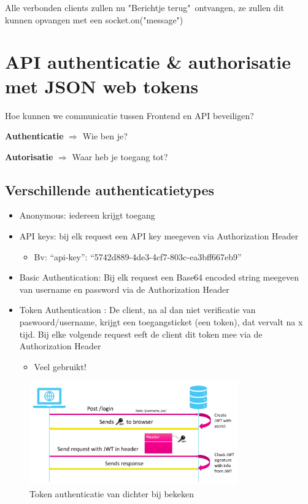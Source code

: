 \documentclass{article}
\newcommand{\bold}[1]{\textbf{#1}}
\begin{document}
Alle verbonden clients zullen nu "Berichtje terug"\ ontvangen,
ze zullen dit kunnen opvangen met een socket.on("message")

\section{API authenticatie \& authorisatie met JSON web tokens}
Hoe kunnen we communicatie tussen Frontend en API beveiligen?

\bold{Authenticatie} $\Rightarrow$ Wie ben je?

\bold{Autorisatie} $\Rightarrow$ Waar heb je toegang tot?

\subsection{Verschillende authenticatietypes}
\begin{itemize}
    \item Anonymous: iedereen krijgt toegang
    \item API keys: bij elk request een API key meegeven via Authorization Header
    \begin{itemize}
        \item Bv: {“api-key”: “5742d889-4de3-4cf7-803c-ea3bff667eb9”}
    \end{itemize}
    \item Basic Authentication: Bij elk request een Base64 encoded string meegeven van username en password via de Authorization Header
    \item Token Authentication : De client, na al dan niet verificatie van paswoord/username, krijgt een toegangsticket (een token), dat vervalt na x tijd. Bij elke volgende request eeft de client dit token mee via de Authorization Header
    \begin{itemize}
        \item Veel gebruikt!
    \end{itemize}
\end{itemize}


\begin{figure}[H]
    \centering
    \includegraphics[width=0.8\textwidth]{img/Screenshot_20200507_202050.png}
    \caption{Token authenticatie van dichter bij bekeken}
\end{figure}
\end{document}
